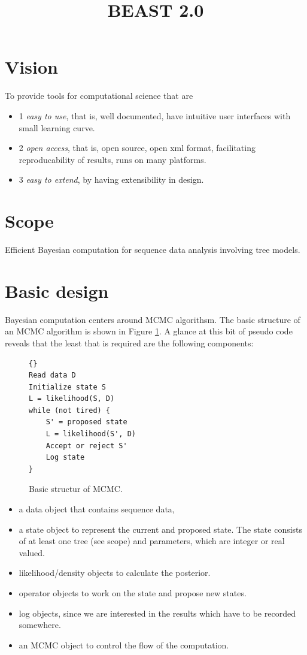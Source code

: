 \documentclass{book}
\begin{document}
\title{BEAST 2.0}
\maketitle

\section*{Vision}
To provide tools for computational science that are
\begin{itemize}
\item
1 {\em easy to use}, that is, well documented, have intuitive user interfaces with small learning curve.
\item
2 {\em open access}, that is, open source, open xml format, facilitating reproducability of results, runs
on many platforms.
\item
3 {\em easy to extend}, by having extensibility in design.
\end{itemize}

\section*{Scope}

Efficient Bayesian computation for sequence data analysis involving tree models.

\section*{Basic design}

Bayesian computation centers around MCMC algorithsm.
The basic structure of an MCMC algorithm is shown in Figure \ref{fig.mcmc}.
A glance at this bit of pseudo code reveals that the least that is required
are the following components:


\begin{figure}[h]
{\scriptsize
\begin{lstlisting}[frame=trbl]{}
Read data D
Initialize state S
L = likelihood(S, D)
while (not tired) {
    S' = proposed state
    L = likelihood(S', D)
    Accept or reject S'
    Log state
}
\end{lstlisting}
}
\caption{\label{fig.mcmc}Basic structur of MCMC.}
\end{figure}

\begin{itemize}
\item a data object that contains sequence data,
\item a state object to represent the current and proposed state.
The state consists of at least one tree (see scope) and parameters,
which are integer or real valued.
\item likelihood/density objects to calculate the posterior.
\item operator objects to work on the state and propose new states.
\item log objects, since we are interested in the results which have to be recorded
somewhere.
\item an MCMC object to control the flow of the computation.
\end{itemize}
\end{document}
